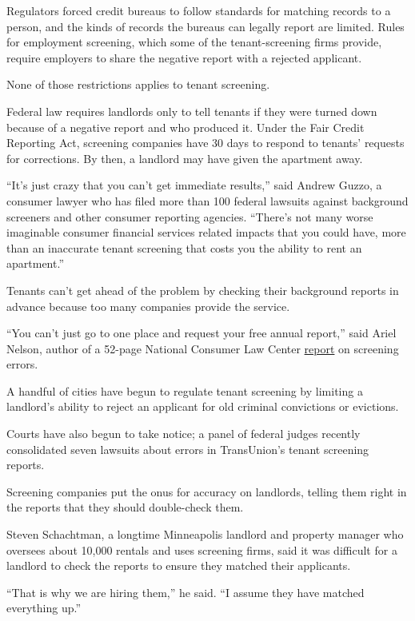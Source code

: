 Regulators forced credit bureaus to follow standards for matching
records to a person, and the kinds of records the bureaus can legally
report are limited. Rules for employment screening, which some of the
tenant-screening firms provide, require employers to share the negative
report with a rejected applicant.

None of those restrictions applies to tenant screening.

Federal law requires landlords only to tell tenants if they were turned
down because of a negative report and who produced it. Under the Fair
Credit Reporting Act, screening companies have 30 days to respond to
tenants' requests for corrections. By then, a landlord may have given
the apartment away.

``It's just crazy that you can't get immediate results,'' said Andrew
Guzzo, a consumer lawyer who has filed more than 100 federal lawsuits
against background screeners and other consumer reporting agencies.
``There's not many worse imaginable consumer financial services related
impacts that you could have, more than an inaccurate tenant screening
that costs you the ability to rent an apartment.''

Tenants can't get ahead of the problem by checking their background
reports in advance because too many companies provide the service.

``You can't just go to one place and request your free annual report,''
said Ariel Nelson, author of a 52-page National Consumer Law Center
\href{https://www.nclc.org/issues/rpt-broken-records-redux.html}{report}
on screening errors.

A handful of cities have begun to regulate tenant screening by limiting
a landlord's ability to reject an applicant for old criminal convictions
or evictions.

Courts have also begun to take notice; a panel of federal judges
recently consolidated seven lawsuits about errors in TransUnion's tenant
screening reports.

Screening companies put the onus for accuracy on landlords, telling them
right in the reports that they should double-check them.

Steven Schachtman, a longtime Minneapolis landlord and property manager
who oversees about 10,000 rentals and uses screening firms, said it was
difficult for a landlord to check the reports to ensure they matched
their applicants.

``That is why we are hiring them,'' he said. ``I assume they have
matched everything up.''

